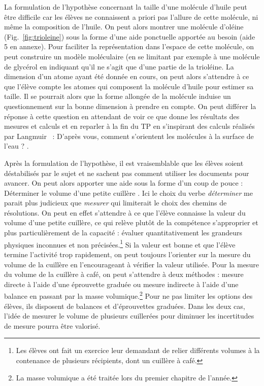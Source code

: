 \documentclass[12pt,a4paper]{article}
\begin{document}
La formulation de l'hypothèse concernant la taille d'une molécule d'huile peut être difficile car les élèves ne connaissent a priori pas l'allure de cette molécule, ni même la composition de l'huile.
On peut alors montrer une molécule d'oléine (Fig.~\ref{fig:trioleine}) sous la forme d'une aide ponctuelle apportée au besoin (aide 5 en annexe).
Pour faciliter la représentation dans l'espace de cette molécule, on peut construire un modèle moléculaire (en se limitant par exemple à une molécule de glycérol en indiquant qu'il ne s'agit que d'une partie de la trioléine.
La dimension d'un atome ayant été donnée en cours, on peut alors s'attendre à ce que l'élève compte les atomes qui composent la \og molécule d'huile \fg{} pour estimer sa taille.
Il se pourrait alors que la forme allongée de la molécule induise un questionnement sur la bonne dimension à prendre en compte.
On peut différer la réponse à cette question en attendant de voir ce que donne les résultats des mesures et calculs et en reparler à la fin du TP en s'inspirant des calculs réalisés par Langmuir~\cite{Langmuir1917} : \og D'après vous, comment s'orientent les molécules à la surface de l'eau ? \fg{}.

Après la formulation de l'hypothèse, il est vraisemblable que les élèves soient déstabilisés par le sujet et ne sachent pas comment utiliser les documents pour avancer.
On peut alors apporter une aide sous la forme d'un coup de pouce : \og Déterminer le volume d'une petite cuillère \fg{}.
Ici le choix du verbe \emph{déterminer} me parait plus judicieux que \emph{mesurer} qui limiterait le choix des chemins de résolutions.
On peut en effet s'attendre à ce que l'élève connaisse la valeur du volume d'une petite cuillère, ce qui relève plutôt de la compétence s'approprier et plus particulièrement de la capacité : évaluer quantitativement les grandeurs physiques inconnues et non précisées.\footnote{Les élèves ont fait un exercice leur demandant de relier différents volumes à la contenance de plusieurs récipients, dont un cuillère à café.}
Si la valeur est bonne et que l'élève termine l'activité trop rapidement, on peut toujours l'orienter sur la mesure du volume de la cuillère en l'encourageant à vérifier la valeur utilisée.
Pour la mesure du volume de la cuillère à café, on peut s'attendre à deux méthodes : mesure \og directe \fg{} à l'aide d'une éprouvette graduée ou mesure \og indirecte \fg{} à l'aide d'une balance en passant par la masse volumique.\footnote{La masse volumique a été traitée lors du premier chapitre de l'année.}
Pour ne pas limiter les options des élèves, ils disposent de balances et d'éprouvettes graduées.
Dans les deux cas, l'idée de mesurer le volume de plusieurs cuillerées pour diminuer les incertitudes de mesure pourra être valorisé.
\end{document}
